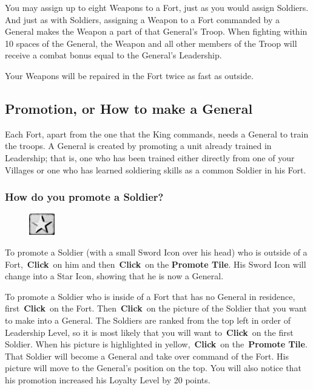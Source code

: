You may assign up to eight Weapons to a Fort, just as you would assign Soldiers. And just as with Soldiers, assigning a Weapon to a Fort commanded by a General makes the Weapon a part of that General’s Troop. When fighting within 10 spaces of the General, the Weapon and all other members of the Troop will receive a combat bonus equal to the General’s Leadership.

Your Weapons will be repaired in the Fort twice as fast as outside.

\subsection{Promotion, or How to make a General}

Each Fort, apart from the one that the King commands, needs a General to train the troops. A General is created by promoting a unit already trained in Leadership; that is, one who has been trained either directly from one of your Villages or one who has learned soldiering skills as a common Soldier in his Fort.

\subsubsection{How do you promote a Soldier?}

\begin{figure}
	\vspace{-20pt}
	\begin{center}
		\includegraphics[width=0.1\textwidth]{Tstar}
	\end{center}
	\vspace{-20pt}
\end{figure}

To promote a Soldier (with a small Sword Icon over his head) who is outside of a Fort, \textbf{Click} on him and then \textbf{Click} on the \textbf{Promote Tile}. His Sword Icon will change into a Star Icon, showing that he is now a General.

To promote a Soldier who is inside of a Fort that has no General in residence, first \textbf{Click} on the Fort. Then \textbf{Click} on the picture of the Soldier that you want to make into a General. The Soldiers are ranked from the top left in order of Leadership Level, so it is most likely that you will want to \textbf{Click} on the first Soldier. When his picture is highlighted in yellow, \textbf{Click} on the \textbf{Promote Tile}. That Soldier will become a General and take over command of the Fort. His picture will move to the General’s position on the top. You will also notice that his promotion increased his Loyalty Level by 20 points.

